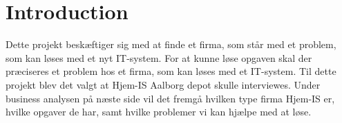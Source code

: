 \chapter{Introduction}\label{ch:introduction}
Dette projekt beskæftiger sig med at finde et firma, som står med et problem, som kan løses med et nyt IT-system. For at kunne løse opgaven skal der præciseres et problem hos et firma, som kan løses med et IT-system. Til dette projekt blev det valgt at Hjem-IS Aalborg depot skulle interviewes. Under business analysen på næste side vil det fremgå hvilken type firma Hjem-IS er, hvilke opgaver de har, samt hvilke problemer vi kan hjælpe med at løse. 